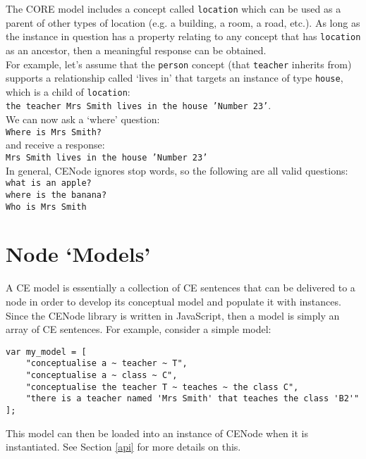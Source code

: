 \documentclass{scrartcl}
\begin{document}
The CORE model includes a concept called \texttt{location} which can be used as a parent of other types of location (e.g. a building, a room, a road, etc.). As long as the instance in question has a property relating to any concept that has \texttt{location} as an ancestor, then a meaningful response can be obtained.\\

For example, let's assume that the \texttt{person} concept (that \texttt{teacher} inherits from) supports a relationship called `lives in' that targets an instance of type \texttt{house}, which is a child of \texttt{location}:\\
\texttt{the teacher Mrs Smith lives in the house 'Number 23'}.\\

We can now ask a `where' question:\\
\texttt{Where is Mrs Smith?}\\
and receive a response:\\
\texttt{Mrs Smith lives in the house 'Number 23'}\\

In general, CENode ignores stop words, so the following are all valid questions:\\
\texttt{what is an apple?}\\
\texttt{where is the banana?}\\
\texttt{Who is Mrs Smith}


\section{Node `Models'}
\label{models}
A CE model is essentially a collection of CE sentences that can be delivered to a node in order to develop its conceptual model and populate it with instances. Since the CENode library is written in JavaScript, then a model is simply an array of CE sentences. For example, consider a simple model:\\
\begin{verbatim}
var my_model = [
    "conceptualise a ~ teacher ~ T",
    "conceptualise a ~ class ~ C",
    "conceptualise the teacher T ~ teaches ~ the class C",
    "there is a teacher named 'Mrs Smith' that teaches the class 'B2'"
];
\end{verbatim}

This model can then be loaded into an instance of CENode when it is instantiated. See Section \ref{api} for more details on this.\\
\end{document}
